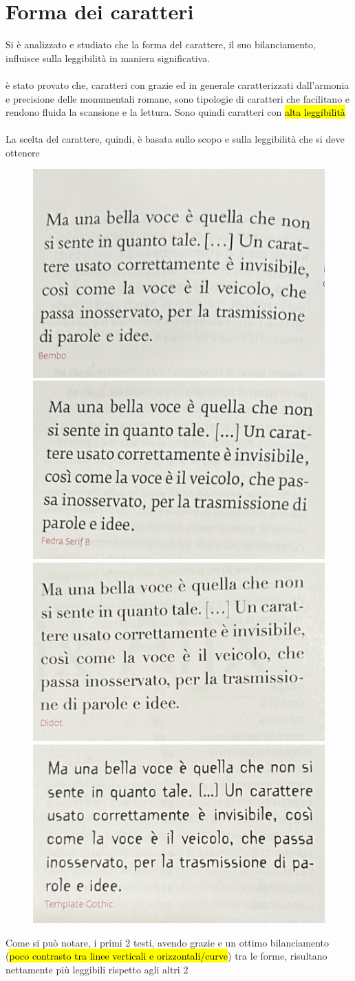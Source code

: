\section{Forma dei caratteri}
Si è analizzato e studiato che la forma del carattere, il suo bilanciamento, influisce sulla leggibilità in maniera significativa.
\\\\
è stato provato che, caratteri con grazie ed in generale caratterizzati dall'armonia e precisione delle monumentali romane, sono tipologie di caratteri che facilitano e rendono fluida la scansione e la lettura. Sono quindi caratteri con \hl{alta leggibilità}
\\\\
La scelta del carattere, quindi, è basata sullo scopo e sulla leggibilità che si deve ottenere
\begin{figure}[H]
    \centering
    \includegraphics[width=0.2\linewidth]{blocco_2 - spiegazioni teorico-pratiche/imgs/f.jpg}
     \includegraphics[width=0.2\linewidth]{blocco_2 - spiegazioni teorico-pratiche/imgs/f2.jpg}
      \includegraphics[width=0.2\linewidth]{blocco_2 - spiegazioni teorico-pratiche/imgs/f3.jpg} \includegraphics[width=0.2\linewidth]{blocco_2 - spiegazioni teorico-pratiche/imgs/f4.jpg}
\end{figure}
Come si può notare, i primi 2 testi, avendo grazie e un ottimo bilanciamento (\hl{poco contrasto tra linee verticali e orizzontali/curve}) tra le forme, risultano nettamente più leggibili rispetto agli altri 2

